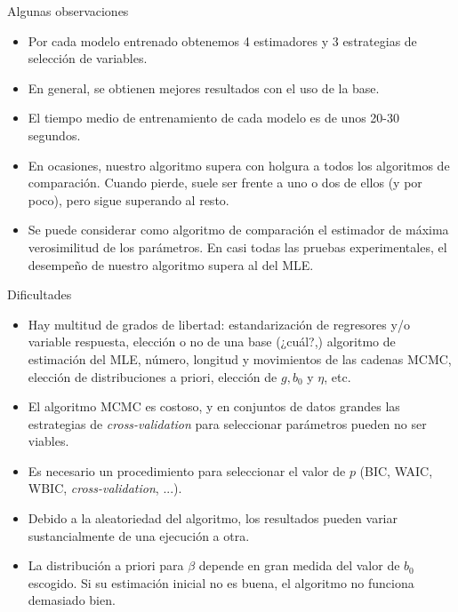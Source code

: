 \documentclass[10pt, english, professionalfonts]{beamer}
\begin{document}
\begin{frame}{Algunas observaciones}
\begin{itemize}
  \item Por cada modelo entrenado obtenemos 4 estimadores y 3 estrategias de selección de variables.
  \item En general, se obtienen mejores resultados con el uso de la base.
  \item El tiempo medio de entrenamiento de cada modelo es de unos 20-30 segundos.
  \item En ocasiones, nuestro algoritmo supera con holgura a todos los algoritmos de comparación. Cuando pierde, suele ser frente a uno o dos de ellos (y por poco), pero sigue superando al resto.
  \item Se puede considerar como algoritmo de comparación el estimador de máxima verosimilitud de los parámetros. En casi todas las pruebas experimentales, el desempeño de nuestro algoritmo supera al del MLE.
\end{itemize}

\end{frame}

\begin{frame}{Dificultades}
  \begin{itemize}


  \item Hay multitud de grados de libertad: estandarización de regresores y/o variable respuesta, elección o no de una base (¿cuál?,) algoritmo de estimación del MLE, número, longitud y movimientos de las cadenas MCMC, elección de distribuciones a priori, elección de \(g, b_0\) y \(\eta\), etc.
  \item El algoritmo MCMC es costoso, y en conjuntos de datos grandes las estrategias de \textit{cross-validation} para seleccionar parámetros pueden no ser viables.
  \item Es necesario un procedimiento para seleccionar el valor de \(p\) (BIC, WAIC, WBIC, \textit{cross-validation}, ...).
  \item Debido a la aleatoriedad del algoritmo, los resultados pueden variar sustancialmente de una ejecución a otra.
  \item La distribución a priori para \(\beta\) depende en gran medida del valor de \(b_0\) escogido. Si su estimación inicial no es buena, el algoritmo no funciona demasiado bien.
\end{itemize}
\end{frame}
\end{document}
